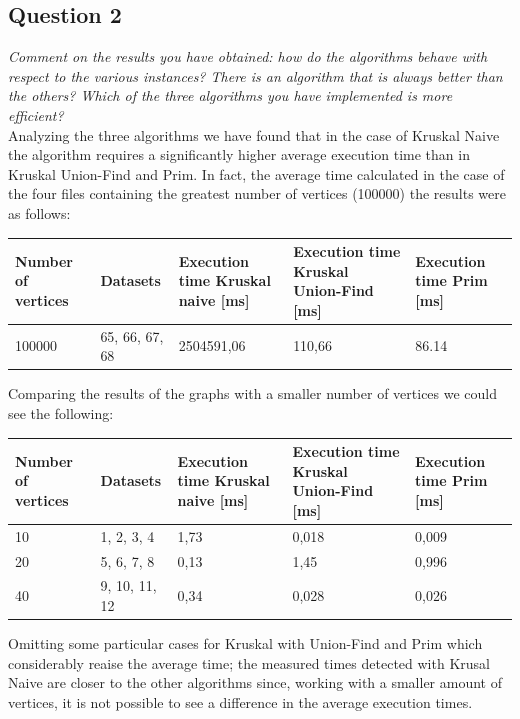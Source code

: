 \subsection{Question 2}
\textit{Comment on the results you have obtained: how do the algorithms behave with respect to the various instances? There is an algorithm that is always better than the others? Which of the three algorithms you have implemented is more efficient?} \\
\noindent
Analyzing the three algorithms we have found that in the case of Kruskal Naive the algorithm requires a significantly higher average execution time than in Kruskal Union-Find and Prim. In fact, the average time calculated in the case of the four files containing the greatest number of vertices (100000) the results were as follows:
\begin{table}[H]\centering
    \begin{tabular}{l|l|l|l|l}
        \textbf{Number of vertices} & \textbf{Datasets} & \textbf{Execution time Kruskal naive [ms]} & \textbf{Execution time Kruskal Union-Find [ms]} & \textbf{Execution time Prim [ms]} \\
    \hline
        100000 & 65, 66, 67, 68 & 2504591,06  & 110,66 & 86.14 
    \end{tabular}
\end{table}
\noindent
Comparing the results of the graphs with a smaller number of vertices we could see the following:
\begin{table}[H]\centering
    \begin{tabular}{l|l|l|l|l}
        \textbf{Number of vertices} & \textbf{Datasets} & \textbf{Execution time Kruskal naive [ms]} & \textbf{Execution time Kruskal Union-Find [ms]} & \textbf{Execution time Prim [ms]} \\
    \hline
        10 & 1, 2, 3, 4    & 1,73     & 0,018   & 0,009 \\
        20 & 5, 6, 7, 8    & 0,13     & 1,45    & 0,996 \\
        40 & 9, 10, 11, 12 & 0,34     & 0,028   & 0,026 \\
    \end{tabular}
\end{table}
\noindent
Omitting some particular cases for Kruskal with Union-Find and Prim which considerably reaise the average time; the measured times detected with Krusal Naive are closer to the other algorithms since, working with a smaller amount of vertices, it is not possible to see a difference in the average execution times.

